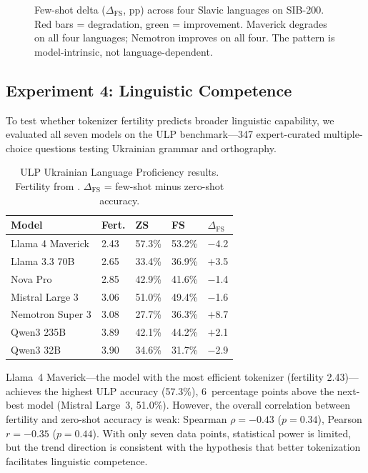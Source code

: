 \documentclass[11pt,a4paper]{article}
\begin{document}
\begin{figure}[t]
\centering

\caption{Few-shot delta ($\Delta_{\text{FS}}$, pp) across four Slavic languages on SIB-200. Red bars = degradation, green = improvement. Maverick degrades on all four languages; Nemotron improves on all four. The pattern is model-intrinsic, not language-dependent.}
\label{fig:fewshot_delta}
\end{figure}

\subsection{Experiment 4: Linguistic Competence}
\label{sec:exp4}

To test whether tokenizer fertility predicts broader linguistic capability, we evaluated all seven models on the ULP benchmark---347 expert-curated multiple-choice questions testing Ukrainian grammar and orthography.

\begin{table}[t]
\centering
\caption{ULP Ukrainian Language Proficiency results. Fertility from \citet{ovcharov2026tokenizer}. $\Delta_{\text{FS}}$ = few-shot minus zero-shot accuracy.}
\label{tab:ulp}
\begin{tabular}{lR{1.2cm}R{1.2cm}R{1.2cm}R{1.4cm}}
\toprule
\textbf{Model} & \textbf{Fert.} & \textbf{ZS} & \textbf{FS} & \textbf{$\Delta_{\text{FS}}$} \\
\midrule
Llama 4 Maverick   & 2.43 & 57.3\% & 53.2\% & $-$4.2 \\
Llama 3.3 70B      & 2.65 & 33.4\% & 36.9\% & $+$3.5 \\
Nova Pro           & 2.85 & 42.9\% & 41.6\% & $-$1.4 \\
Mistral Large 3    & 3.06 & 51.0\% & 49.4\% & $-$1.6 \\
Nemotron Super 3   & 3.08 & 27.7\% & 36.3\% & $+$8.7 \\
Qwen3 235B         & 3.89 & 42.1\% & 44.2\% & $+$2.1 \\
Qwen3 32B          & 3.90 & 34.6\% & 31.7\% & $-$2.9 \\
\bottomrule
\end{tabular}
\end{table}

Llama~4 Maverick---the model with the most efficient tokenizer (fertility 2.43)---achieves the highest ULP accuracy (57.3\%), 6~percentage points above the next-best model (Mistral Large~3, 51.0\%). However, the overall correlation between fertility and zero-shot accuracy is weak: Spearman $\rho = -0.43$ ($p = 0.34$), Pearson $r = -0.35$ ($p = 0.44$). With only seven data points, statistical power is limited, but the trend direction is consistent with the hypothesis that better tokenization facilitates linguistic competence.
\end{document}
